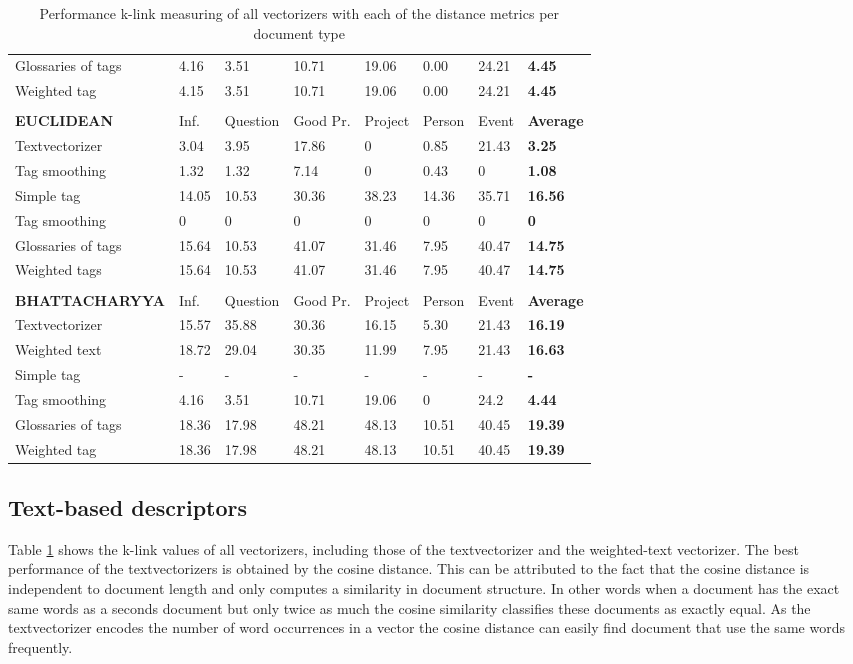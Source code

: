 \begin{table}
\begin{tabular}{| l | l | l | l | l | l | l | l |}
Glossaries of tags & 4.16 & 3.51 & 10.71 & 19.06 & 0.00 & 24.21 & {\bf 4.45} \\ 
Weighted tag & 4.15 & 3.51 & 10.71 & 19.06 & 0.00 & 24.21 & {\bf 4.45} \\ 
\hline
\\
\hline
{\bf EUCLIDEAN} & Inf. &  Question &  Good Pr.& Project & Person &  Event & {\bf Average} \\
\hline
Textvectorizer & 3.04 & 3.95 & 17.86 & 0 & 0.85 & 21.43 & {\bf 3.25} \\ 
Tag smoothing & 1.32 & 1.32 & 7.14 & 0 & 0.43 & 0 & {\bf 1.08} \\ 
Simple tag & 14.05 & 10.53  & 30.36 & 38.23 & 14.36 & 35.71 & {\bf 16.56} \\ 
Tag smoothing & 0 & 0 & 0 & 0 & 0 & 0 & {\bf 0} \\ 
Glossaries of tags & 15.64 & 10.53 & 41.07 & 31.46 & 7.95 & 40.47 & {\bf 14.75} \\ 
Weighted tags & 15.64 & 10.53 & 41.07 & 31.46 & 7.95 & 40.47 & {\bf 14.75} \\ 
\hline
\\
\hline
{\bf BHATTACHARYYA} & Inf. &  Question &  Good Pr.& Project & Person &  Event & {\bf Average} \\
\hline
Textvectorizer & 15.57 & 35.88 & 30.36 & 16.15 & 5.30 & 21.43 & {\bf 16.19} \\ 
Weighted text & 18.72 & 29.04 & 30.35 & 11.99 & 7.95 & 21.43 & {\bf 16.63} \\ 
Simple tag & - & - & - & - & - & - & {\bf -} \\ 
Tag smoothing & 4.16 & 3.51 & 10.71 & 19.06 & 0 & 24.2 & {\bf 4.44} \\ 
Glossaries of tags & 18.36 & 17.98 & 48.21 & 48.13 & 10.51 & 40.45 & {\bf 19.39} \\ 
Weighted tag & 18.36 & 17.98 & 48.21 & 48.13 & 10.51 & 40.45 & {\bf 19.39} \\ 
\hline
\end{tabular}

\caption{Performance k-link measuring of all vectorizers with each of the distance metrics per document type}
\label{klink}
\end{table}

\subsection{Text-based descriptors}
Table \ref{klink} shows the k-link values of all vectorizers, including those of the textvectorizer and the weighted-text vectorizer. The best performance of the textvectorizers is obtained by the cosine distance. This can be attributed
 to the fact that the cosine distance is independent to document length and only
 computes a similarity in document structure. In other words when a document
 has the exact same words as a seconds document but only twice as much the
 cosine similarity classifies these documents as exactly equal. As the textvectorizer
 encodes the number of word occurrences in a vector the cosine distance can 
 easily find document that use the same words frequently.

